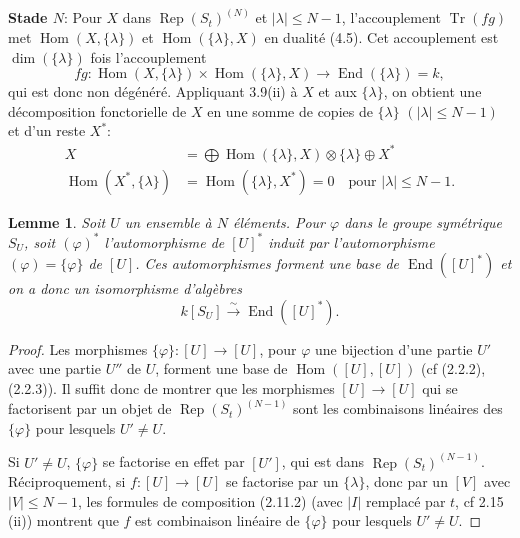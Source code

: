 \documentclass[11pt,a4paper]{article}
\theoremstyle{plain}
\newtheorem{lemma}[theorem]{Lemme}
\theoremstyle{definition}
\DeclareMathOperator{\Hom}{Hom}
\DeclareMathOperator{\End}{End}
\DeclareMathOperator{\Tr}{Tr}
\DeclareMathOperator{\Rep}{Rep}
\newcommand{\isom}{\xrightarrow{\sim}}
\begin{document}
\textbf{Stade $N$}: Pour $X$ dans $\Rep(S_t)^{(N)}$ et $|\lambda| \leq N-1$, l'accouplement $\Tr(fg)$ met $\Hom(X, \{\lambda\})$ et $\Hom(\{\lambda\}, X)$ en dualit\'e (4.5). Cet accouplement est $\dim(\{\lambda\})$ fois l'accouplement
\begin{equation}
fg : \Hom(X, \{\lambda\}) \times \Hom(\{\lambda\}, X) \to \End(\{\lambda\}) = k, \tag{5.1.1}
\end{equation}
qui est donc non d\'eg\'en\'er\'e. Appliquant 3.9(ii) \`a $X$ et aux $\{\lambda\}$, on obtient une d\'ecomposition fonctorielle de $X$ en une somme de copies de $\{\lambda\}$ $(|\lambda| \leq N-1)$ et d'un reste $X^*$:
\begin{align}
X &= \bigoplus \Hom(\{\lambda\}, X) \otimes \{\lambda\} \oplus X^* \tag{5.1.2} \\
\Hom(X^*, \{\lambda\}) &= \Hom(\{\lambda\}, X^*) = 0 \quad \text{pour } |\lambda| \leq N-1. \tag{5.1.3}
\end{align}

\begin{lemma}
Soit $U$ un ensemble \`a $N$ \'el\'ements. Pour $\varphi$ dans le groupe sym\'etrique $S_U$, soit $(\varphi)^*$ l'automorphisme de $[U]^*$ induit par l'automorphisme $(\varphi) = \{\varphi\}$ de $[U]$. Ces automorphismes forment une base de $\End([U]^*)$ et on a donc un isomorphisme d'alg\`ebres
\begin{equation}
k[S_U] \isom \End([U]^*). \tag{5.2.1}
\end{equation}
\end{lemma}

\begin{proof}
Les morphismes $\{\varphi\} : [U] \to [U]$, pour $\varphi$ une bijection d'une partie $U'$ avec une partie $U''$ de $U$, forment une base de $\Hom([U], [U])$ (cf (2.2.2), (2.2.3)). Il suffit donc de montrer que les morphismes $[U] \to [U]$ qui se factorisent par un objet de $\Rep(S_t)^{(N-1)}$ sont les combinaisons lin\'eaires des $\{\varphi\}$ pour lesquels $U' \neq U$.

Si $U' \neq U$, $\{\varphi\}$ se factorise en effet par $[U']$, qui est dans $\Rep(S_t)^{(N-1)}$. R\'eciproquement, si $f : [U] \to [U]$ se factorise par un $\{\lambda\}$, donc par un $[V]$ avec $|V| \leq N-1$, les formules de composition (2.11.2) (avec $|I|$ remplac\'e par $t$, cf 2.15 (ii)) montrent que $f$ est combinaison lin\'eaire de $\{\varphi\}$ pour lesquels $U' \neq U$.
\end{proof}
\end{document}
